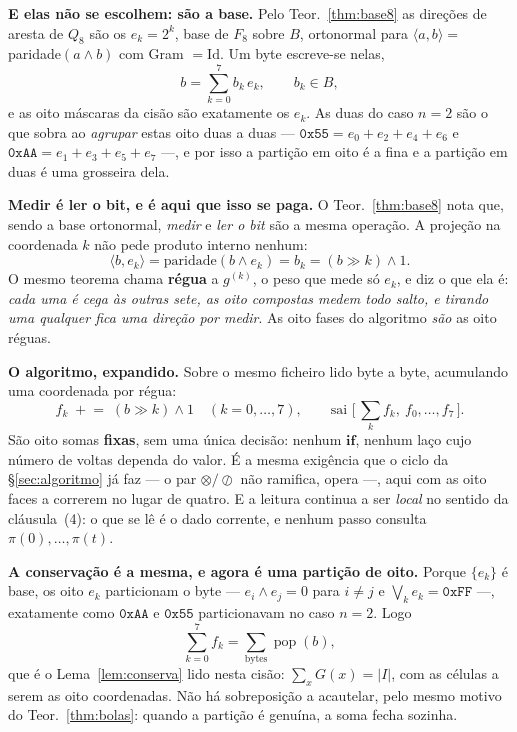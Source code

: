 \documentclass[11pt,a4paper]{article}
\newcommand{\abs}[1]{\lvert #1\rvert}
\begin{document}
\medskip\noindent\textbf{E elas não se escolhem: são a base.} Pelo
Teor.~\ref{thm:base8} as direções de aresta de $Q_8$ são os $e_k=2^{k}$, base de
$F_8$ sobre $B$, ortonormal para $\langle a,b\rangle=$ paridade$(a\wedge b)$ com
Gram $=\mathrm{Id}$. Um byte escreve-se nelas,
\[
b=\sum_{k=0}^{7} b_k\,e_k ,\qquad b_k\in B ,
\]
e as oito máscaras da cisão são exatamente os $e_k$. As duas do caso $n=2$ são o
que sobra ao \emph{agrupar} estas oito duas a duas ---
$\mathtt{0x55}=e_0{+}e_2{+}e_4{+}e_6$ e $\mathtt{0xAA}=e_1{+}e_3{+}e_5{+}e_7$
---, e por isso a partição em oito é a fina e a partição em duas é uma
grosseira dela.

\medskip\noindent\textbf{Medir é ler o bit, e é aqui que isso se paga.} O
Teor.~\ref{thm:base8} nota que, sendo a base ortonormal, \emph{medir} e
\emph{ler o bit} são a mesma operação. A projeção na coordenada $k$ não pede
produto interno nenhum:
\[
\langle b,e_k\rangle=\text{paridade}(b\wedge e_k)=b_k=(b\gg k)\wedge 1 .
\]
O mesmo teorema chama \textbf{régua} a $g^{(k)}$, o peso que mede só $e_k$, e
diz o que ela é: \emph{cada uma é cega às outras sete, as oito compostas medem
todo salto, e tirando uma qualquer fica uma direção por medir}. As oito fases do
algoritmo \emph{são} as oito réguas.

\medskip\noindent\textbf{O algoritmo, expandido.} Sobre o mesmo ficheiro lido
byte a byte, acumulando uma coordenada por régua:
\[
\boxed{\;
f_k \;\mathrel{+}=\; (b\gg k)\wedge 1 \quad (k=0,\dots,7),
\qquad
\text{sai } \bigl[\,\textstyle\sum_k f_k,\ f_0,\dots,f_7\,\bigr].
\;}
\]
São oito somas \textbf{fixas}, sem uma única decisão: nenhum $\mathbf{if}$,
nenhum laço cujo número de voltas dependa do valor. É a mesma exigência que o
ciclo da §\ref{sec:algoritmo} já faz --- o par $\otimes/\oslash$ não ramifica,
opera ---, aqui com as oito faces a correrem no lugar de quatro. E a leitura
continua a ser \emph{local} no sentido da cláusula~(4): o que se lê é o dado
corrente, e nenhum passo consulta $\pi(0),\dots,\pi(t)$.

\medskip\noindent\textbf{A conservação é a mesma, e agora é uma partição de
oito.} Porque $\{e_k\}$ é base, os oito $e_k$ particionam o byte --- $e_i\wedge
e_j=0$ para $i\neq j$ e $\bigvee_k e_k=\mathtt{0xFF}$ ---, exatamente como
$\mathtt{0xAA}$ e $\mathtt{0x55}$ particionavam no caso $n=2$. Logo
\[
\sum_{k=0}^{7} f_k=\sum_{\text{bytes}}\operatorname{pop}(b),
\]
que é o Lema~\ref{lem:conserva} lido nesta cisão: $\sum_x G(x)=\abs{I}$, com as
células a serem as oito coordenadas. Não há sobreposição a acautelar, pelo mesmo
motivo do Teor.~\ref{thm:bolas}: quando a partição é genuína, a soma fecha
sozinha.
\end{document}
